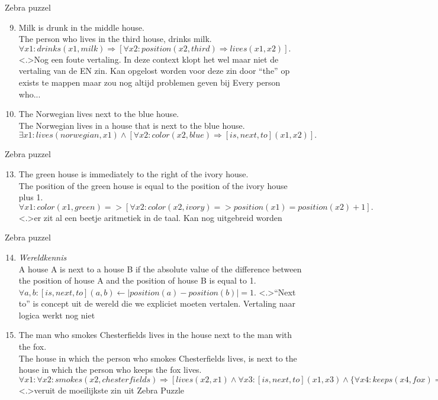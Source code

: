 \documentclass[notes]{beamer}
\newcommand{\hitem}{
	\ppause
	\item
}
\newcommand{\ppause}{\onslide<+>}
\newcommand{\nnote}[1]{\note<.>{#1}}
\begin{document}
  \begin{frame}{Zebra puzzel\cite{ZebraPuzzle}}
    \begin{enumerate}
      \setcounter{enumi}{8}
      \hitem Milk is drunk in the middle house. \\ The person who lives in the third house, drinks milk. \\ $\forall x1: drinks(x1,milk) \Rightarrow [\forall x2: position(x2,third) \Rightarrow lives(x1,x2)].$ \\
      \nnote{Nog een foute vertaling. In deze context klopt het wel maar niet de vertaling van de EN zin. Kan opgelost worden voor deze zin door ``the'' op exists te mappen maar zou nog altijd problemen geven bij Every person who...}
      \hitem The Norwegian lives next to the blue house. \\ The Norwegian lives in a house that is next to the blue house. \\ $\exists x1: lives(norwegian,x1) \land [\forall x2: color(x2,blue) \Rightarrow [is,next,to](x1,x2)].$ \\
    \end{enumerate}
  \end{frame}
  \begin{frame}{Zebra puzzel\cite{ZebraPuzzle}}
    \begin{enumerate}
      \setcounter{enumi}{12}
      \hitem The green house is immediately to the right of the ivory house. \\ The position of the green house is equal to the position of the ivory house plus 1. \\ $\forall x1: color(x1,green) => [\forall x2: color(x2,ivory) => position(x1)=position(x2)+1].$
      \nnote{er zit al een beetje aritmetiek in de taal. Kan nog uitgebreid worden}
    \end{enumerate}
  \end{frame}
  \begin{frame}{Zebra puzzel\cite{ZebraPuzzle}}
    \begin{enumerate}
      \setcounter{enumi}{13}
      \hitem \textit{Wereldkennis} \\ A house A is next to a house B if the absolute value of the difference between the position of house A and the position of house B is equal to 1. \\ $\forall a, b: [is,next,to](a, b) \leftarrow |position(a)-position(b)|=1.$
      \nnote{``Next to'' is concept uit de wereld die we expliciet moeten vertalen. Vertaling naar logica werkt nog niet}
      \hitem The man who smokes Chesterfields lives in the house next to the man with the fox. \\ The house in which the person who smokes Chesterfields lives, is next to the house in which the person who keeps the fox lives. \\ $\forall x1: \forall x2: smokes(x2,chesterfields) \Rightarrow [lives(x2,x1) \land \forall x3: [is,next,to](x1,x3) \land \{\forall x4: keeps(x4,fox) \Rightarrow lives(x4,x3)\}].$
      \nnote{veruit de moeilijkste zin uit Zebra Puzzle}
    \end{enumerate}
  \end{frame}
\end{document}
